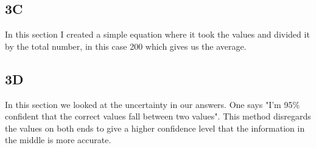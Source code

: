 \documentclass[twocolumn]{revtex4}
\begin{document}
\subsection{3C}


In this section I created a simple equation where it took the values and divided it by the total number, in this case 200 which gives us the average.

\subsection{3D}

In this section we looked at the uncertainty in our answers. One says "I'm 95\% confident that the correct values fall between two values". This method disregards the values on both ends to give a higher confidence level that the information in the middle is more accurate.
\end{document}
